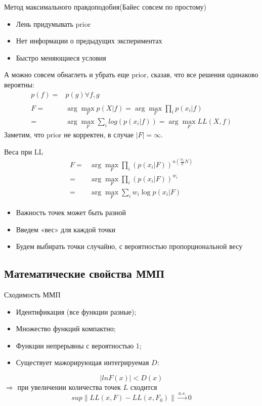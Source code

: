 \documentclass[14pt, fleqn, xcolor={dvipsnames, table}]{beamer}
\begin{document}
\begin{frame}{Метод максимального правдоподобия}{(Байес совсем по простому)}
\begin{itemize}
  \item Лень придумывать prior
  \item Нет информации о предыдущих экспериментах
  \item Быстро меняющиеся условия
\end{itemize}
А можно совсем обнаглеть и убрать еще prior, сказав, что все решения одинаково вероятны:
$$\begin{array}{rl}
p(f) = & p(g) \forall f,g \\
\\
F = & \arg \max_F p(X|f) = \arg \max_F \prod_i p(x_i | f) \\
= & \arg \max_F \sum_i log(p(x_i | f)) = \arg \max_F LL(X, f)
\end{array}$$
Заметим, что prior не корректен, в случае $|F| = \infty$.
\end{frame}

\begin{frame}{Веса при LL}
$$\begin{array}{rl}
F = & \arg \max_F \prod_i \left(p(x_i | F)\right)^{n(\frac{w_i}{Z}N)} \\
= & \arg \max_F \prod_i \left(p(x_i | F)\right)^{w_i} \\
= & \arg \max_F \sum_i w_i \log p(x_i|F)
\end{array}$$
\begin{itemize}
  \item Важность точек может быть разной
  \item Введем «вес» для каждой точки
  \item Будем выбирать точки случайно, с вероятностью пропорциональной весу
\end{itemize}
\end{frame}

\subsection{Математические свойства ММП}

\begin{frame}{Сходимость ММП}
\begin{itemize}
  \item Идентификация (все функции разные);
  \item Множество функций компактно;
  \item Функции непрерывны с вероятностью 1;
  \item Существует мажорирующая интегрируемая $D$:
\end{itemize}
  $$
  | ln F(x) | < D(x)
  $$
  $\Longrightarrow$ при увеличении количества точек $L$ сходится
  $$
    sup\|LL(x, F) - LL(x, F_0)\| \overset{a.s.}{\to} 0
  $$
\end{frame}
\end{document}
